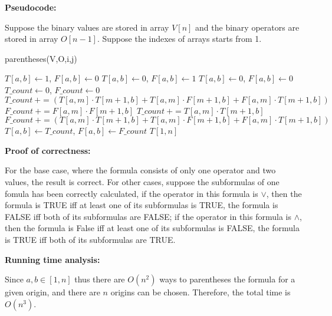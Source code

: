\documentclass{article}
\begin{document}
{\par\textbf{Pseudocode: }
\par Suppose the binary values are stored in array $V[n]$ and the binary operators are stored in array $O[n-1]$. Suppose the indexes of arrays starts from 1.
\begin{algorithm}
	\caption{parentheses(V,O,i,j)}
	\label{alg2}
	\color{blue}
	\begin{algorithmic}
						\STATE $T[a,b] \gets 1$, $F[a,b] \gets 0$
					\ELSE
						\STATE $T[a,b] \gets 0$, $F[a,b] \gets 1$
					\ENDIF
				\ELSE
					\STATE $T[a,b] \gets 0$, $F[a,b] \gets 0$
				\ENDIF
				\STATE $T\_count \gets 0$, $F\_count \gets 0$
						\STATE $T\_count\ += (T[a,m]\cdot T[m+1,b]+T[a,m]\cdot F[m+1,b]+F[a,m]\cdot T[m+1,b])$
						\STATE $F\_count\ += F[a,m]\cdot F[m+1,b]$
					\ELSE
						\STATE $T\_count\ += T[a,m]\cdot T[m+1,b]$
						\STATE $F\_count\ += (T[a,m]\cdot T[m+1,b]+T[a,m]\cdot F[m+1,b]+F[a,m]\cdot T[m+1,b]) $
					\ENDIF
				\ENDWHILE
				\STATE $T[a,b] \gets T\_count$, $F[a,b] \gets F\_count$
			\ENDWHILE
		\ENDWHILE
		\RETURN $T[1,n]$
	\end{algorithmic}
\end{algorithm}

\par\textbf{Proof of correctness: }
\par For the base case, where the formula consists of only one operator and two values, the result is correct. For other cases, suppose the subformulas of one fomula has been correctly calculated, if the operator in this formula is $\lor$, then the formula is TRUE iff at least one of its subformulas is TRUE, the formula is FALSE iff both of its subformulas are FALSE; if the operator in this formula is $\land$, then the formula is False iff at least one of its subformulas is FALSE, the formula is TRUE iff both of its subformulas are TRUE. \\

\par\textbf{Running time analysis: }
\par Since $a,b \in [1,n]$ thus there are $O(n^2)$ ways to parentheses the formula for a given origin, and there are $n$ origins can be chosen. Therefore, the total time is $O(n^3)$.
}
\end{document}
